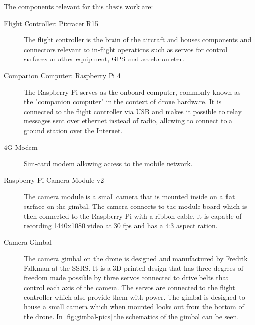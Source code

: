 \documentclass[nofilelist]{cslthse-msc}
\begin{document}
The components relevant for this thesis work are:
\begin{description}
   \item[Flight Controller: Pixracer R15] The flight controller is the brain of the aircraft and houses components and connectors relevant to in-flight operations such as servos for control surfaces or other equipment, GPS and accelorometer.

   \item[Companion Computer: Raspberry Pi 4] The Raspberry Pi serves as the onboard computer, commonly known as the "companion computer" in the context of drone hardware. It is connected to the flight controller via USB and makes it possible to relay messages sent over ethernet instead of radio, allowing to connect to a ground station over the Internet. 
   
   \item[4G Modem] Sim-card modem allowing access to the mobile network. 
   
   \item[Raspberry Pi Camera Module v2] The camera module is a small camera that is mounted inside on a flat surface on the gimbal. The camera connects to the module board which is then connected to the Raspberry Pi with a ribbon cable. It is capable of recording 1440x1080 video at 30 fps and has a 4:3 aspect ration. 

   \item[Camera Gimbal] The camera gimbal on the drone is designed and manufactured by Fredrik Falkman at the SSRS. It is a 3D-printed design that has three degrees of freedom made possible by three servos connected to drive belts that control each axis of the camera. The servos are connected to the flight controller which also provide them with power. The gimbal is designed to house a small camera which when mounted looks out from the bottom of the drone. In \ref{fig:gimbal-pics} the schematics of the gimbal can be seen. 
   

\end{description}
\end{document}
